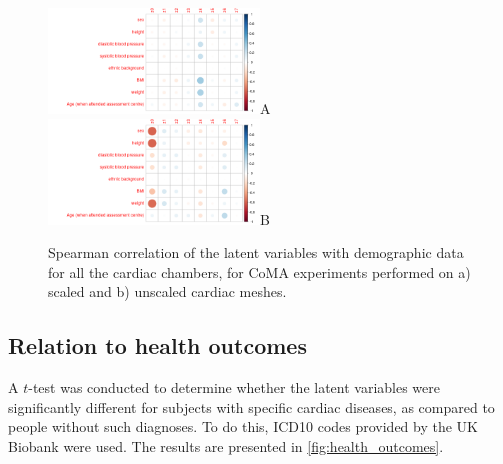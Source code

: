 \begin{figure}[ht!]
\includegraphics[width=0.5\textwidth]{figs/correlation/experiment_1_vs_demographic_data}A
\includegraphics[width=0.5\textwidth]{figs/correlation/experiment_2_vs_demographic_data}B
\label{fig:relation_to_demographic}
\caption{Spearman correlation of the latent variables with demographic data for all the cardiac chambers, for CoMA experiments performed on a) scaled and b) unscaled cardiac meshes.}
\end{figure}

\subsection*{Relation to health outcomes}
A $t$-test was conducted to determine whether the latent variables were significantly different for subjects with specific cardiac diseases, as compared to people without such diagnoses. To do this, ICD10 codes provided by the UK Biobank were used. The results are presented in \ref{fig:health_outcomes}.



